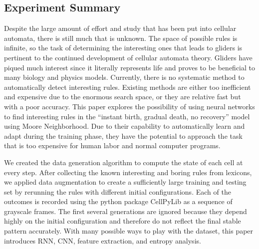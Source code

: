 \documentclass[12pt]{article}
\numberwithin{figure}{section} %
\begin{document}
\subsection{Experiment Summary}
Despite the large amount of effort and study that has been put into cellular automata, there is still much that is unknown. The space of possible rules is infinite, so the task of determining the interesting ones that leads to gliders is pertinent to the continued development of cellular automata theory. Gliders have piqued much interest since it literally represents life and proves to be beneficial to many biology and physics models. Currently, there is no systematic method to automatically detect interesting rules. Existing methods are either too inefficient and expensive due to the enormous search space, or they are relative fast but with a poor accuracy. This paper explores the possibility of using neural networks to find interesting rules in the “instant birth, gradual death, no recovery” model using Moore Neighborhood. Due to their capability to automatically learn and adapt during the training phase, they have the potential to approach the task that is too expensive for human labor and normal computer programs. 

We created the data generation algorithm to compute the state of each cell at every step. After collecting the known interesting and boring rules from lexicons, we applied data augmentation to create a sufficiently large training and testing set by rerunning the rules with different initial configurations. Each of the outcomes is recorded using the python package CellPyLib as a sequence of grayscale frames. The first several generations are ignored because they depend highly on the initial configuration and therefore do not reflect the final stable pattern accurately. With many possible ways to play with the dataset, this paper introduces RNN, CNN, feature extraction, and entropy analysis. 
\end{document}
